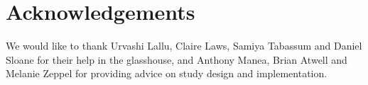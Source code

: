 \documentclass[12pt,a4paper]{memoir}
\begin{document}
\section*{Acknowledgements}
We would like to thank Urvashi Lallu, Claire Laws, Samiya Tabassum and Daniel Sloane for their help in the glasshouse, and Anthony Manea, Brian Atwell and Melanie Zeppel for providing advice on study design and implementation.

\renewcommand\bibname{{library}}
\begin{small}


\end{small}
\end{document}
